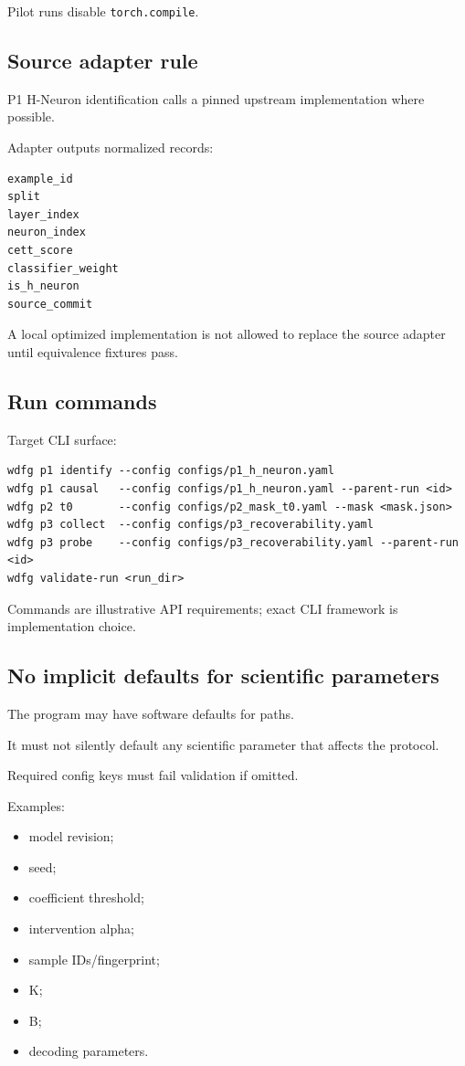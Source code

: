 Pilot runs disable \passthrough{\lstinline!torch.compile!}.

\subsection{Source adapter rule}\label{source-adapter-rule}

P1 H-Neuron identification calls a pinned upstream implementation where possible.

Adapter outputs normalized records:

\begin{lstlisting}
example_id
split
layer_index
neuron_index
cett_score
classifier_weight
is_h_neuron
source_commit
\end{lstlisting}

A local optimized implementation is not allowed to replace the source adapter until equivalence fixtures pass.

\subsection{Run commands}\label{run-commands}

Target CLI surface:

\begin{lstlisting}
wdfg p1 identify --config configs/p1_h_neuron.yaml
wdfg p1 causal   --config configs/p1_h_neuron.yaml --parent-run <id>
wdfg p2 t0       --config configs/p2_mask_t0.yaml --mask <mask.json>
wdfg p3 collect  --config configs/p3_recoverability.yaml
wdfg p3 probe    --config configs/p3_recoverability.yaml --parent-run <id>
wdfg validate-run <run_dir>
\end{lstlisting}

Commands are illustrative API requirements; exact CLI framework is implementation choice.

\subsection{No implicit defaults for scientific parameters}\label{no-implicit-defaults-for-scientific-parameters}

The program may have software defaults for paths.

It must not silently default any scientific parameter that affects the protocol.

Required config keys must fail validation if omitted.

Examples:

\begin{itemize}
\tightlist
\item
  model revision;
\item
  seed;
\item
  coefficient threshold;
\item
  intervention alpha;
\item
  sample IDs/fingerprint;
\item
  K;
\item
  B;
\item
  decoding parameters.
\end{itemize}

